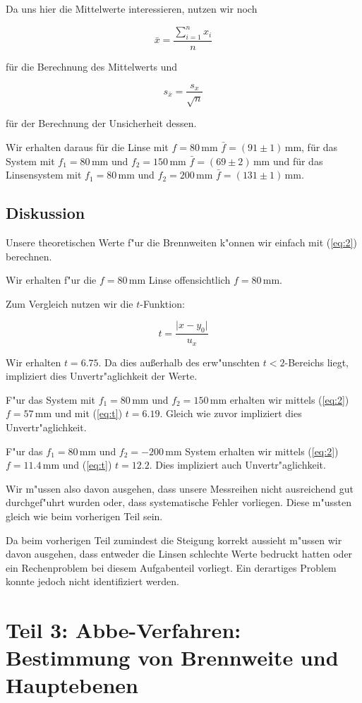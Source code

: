 \documentclass[11pt,a4paper]{article}
\newcommand\mean{\begin{equation}
\bar{x}=\frac{\sum_{i=1}^n x_{i}}{n}\label{mean}
\end{equation}}
\newcommand\meanstd{\begin{equation}
s_{\bar{x}}=\frac{s_x}{\sqrt{n}}\label{meanstd}
\end{equation}}
\begin{document}
Da uns hier die Mittelwerte interessieren, nutzen wir noch

\mean

f\"ur die Berechnung des Mittelwerts und

\meanstd

f\"ur der Berechnung der Unsicherheit dessen.

Wir erhalten daraus f\"ur die Linse mit $f=80\,$mm $\bar{f}=(91\pm1)\,$mm, f\"ur das System mit $f_1=80\,$mm und $f_2=150\,$mm $\bar{f}=(69\pm2)\,$mm und f\"ur das Linsensystem mit $f_1=80\,$mm und $f_2=200\,$mm $\bar{f}=(131\pm1)\,$mm.

\subsection{Diskussion}

Unsere theoretischen Werte f"ur die Brennweiten k"onnen wir einfach mit (\ref{eq:2}) berechnen. 

Wir erhalten f"ur die $f=80\,$mm Linse offensichtlich $f=80$\,mm.

Zum Vergleich nutzen wir die $t$-Funktion:

\begin{equation}
t=\frac{\vert x-y_0\vert}{u_x}\label{eq:t}
\end{equation}

Wir erhalten $t=6.75$. Da dies au\ss erhalb des erw"unschten $t<2$-Bereichs liegt, impliziert dies Unvertr"aglichkeit der Werte.

F"ur das System mit $f_1=80\,$mm und $f_2=150\,$mm erhalten wir mittels (\ref{eq:2}) $f=57\,$mm und mit (\ref{eq:t}) $t=6.19$. Gleich wie zuvor impliziert dies Unvertr"aglichkeit.

F"ur das $f_1=80\,$mm und $f_2=-200\,$mm System erhalten wir mittels (\ref{eq:2}) $f=11.4\,$mm und (\ref{eq:t}) $t=12.2$. Dies impliziert auch Unvertr"aglichkeit.

Wir m"ussen also davon ausgehen, dass unsere Messreihen nicht ausreichend gut durchgef"uhrt wurden oder, dass systematische Fehler vorliegen. Diese m"ussten gleich wie beim vorherigen Teil sein.

Da beim vorherigen Teil zumindest die Steigung korrekt aussieht m"ussen wir davon ausgehen, dass entweder die Linsen schlechte Werte bedruckt hatten oder ein Rechenproblem bei diesem Aufgabenteil vorliegt. Ein derartiges Problem konnte jedoch nicht identifiziert werden.

\section{Teil 3: Abbe-Verfahren: Bestimmung von Brennweite und Hauptebenen}
\end{document}
